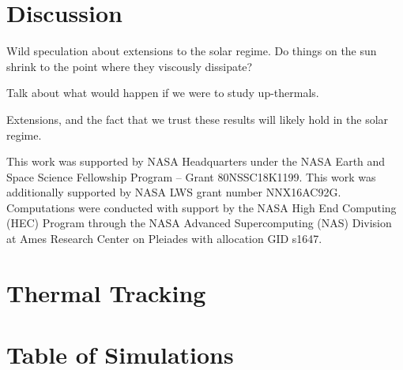 \documentclass[twocolumn, amsmath, amsfonts, amssymb, trackchanges]{aastex62}
\begin{document}
\section{Discussion}
\label{sec:discussion}
Wild speculation about extensions to the solar regime. Do things on the sun shrink
to the point where they viscously dissipate?

Talk about what would happen if we were to study up-thermals.

Extensions, and the fact that we trust these results will likely hold in the solar regime.



\begin{acknowledgements}
This work was supported by NASA Headquarters under the NASA Earth and Space
Science Fellowship Program -- Grant 80NSSC18K1199.
This work was additionally supported by  NASA LWS grant number NNX16AC92G.  
Computations were conducted 
with support by the NASA High End Computing (HEC) Program through the NASA 
Advanced Supercomputing (NAS) Division at Ames Research Center on Pleiades
with allocation GID s1647.
\end{acknowledgements}

\appendix
\section{Thermal Tracking}
\label{appendix:tracking}

\section{Table of Simulations}
\label{appendix:table}
\end{document}
